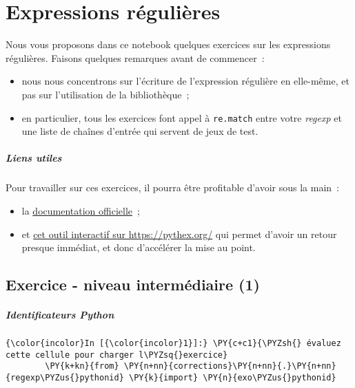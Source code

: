     
    
    
    

    

    \hypertarget{expressions-ruxe9guliuxe8res}{%
\section{Expressions régulières}\label{expressions-ruxe9guliuxe8res}}

    Nous vous proposons dans ce notebook quelques exercices sur les
expressions régulières. Faisons quelques remarques avant de commencer~:

\begin{itemize}
\tightlist
\item
  nous nous concentrons sur l'écriture de l'expression régulière en
  elle-même, et pas sur l'utilisation de la bibliothèque~;
\item
  en particulier, tous les exercices font appel à \texttt{re.match}
  entre votre \emph{regexp} et une liste de chaînes d'entrée qui servent
  de jeux de test.
\end{itemize}

    \hypertarget{liens-utiles}{%
\subparagraph{Liens utiles}\label{liens-utiles}}

    Pour travailler sur ces exercices, il pourra être profitable d'avoir
sous la main~:

\begin{itemize}
\tightlist
\item
  la
  \href{https://docs.python.org/3/library/re.html\#regular-expression-syntax}{documentation
  officielle}~;
\item
  et \href{https://pythex.org/}{cet outil interactif sur
  https://pythex.org/} qui permet d'avoir un retour presque immédiat, et
  donc d'accélérer la mise au point.
\end{itemize}

    \hypertarget{exercice---niveau-intermuxe9diaire-1}{%
\subsection{Exercice - niveau intermédiaire
(1)}\label{exercice---niveau-intermuxe9diaire-1}}

    \hypertarget{identificateurs-python}{%
\subparagraph{Identificateurs Python}\label{identificateurs-python}}

    \begin{Verbatim}[commandchars=\\\{\},frame=single,framerule=0.3mm,rulecolor=\color{cellframecolor}]
{\color{incolor}In [{\color{incolor}1}]:} \PY{c+c1}{\PYZsh{} évaluez cette cellule pour charger l\PYZsq{}exercice}
        \PY{k+kn}{from} \PY{n+nn}{corrections}\PY{n+nn}{.}\PY{n+nn}{regexp\PYZus{}pythonid} \PY{k}{import} \PY{n}{exo\PYZus{}pythonid}
\end{Verbatim}


